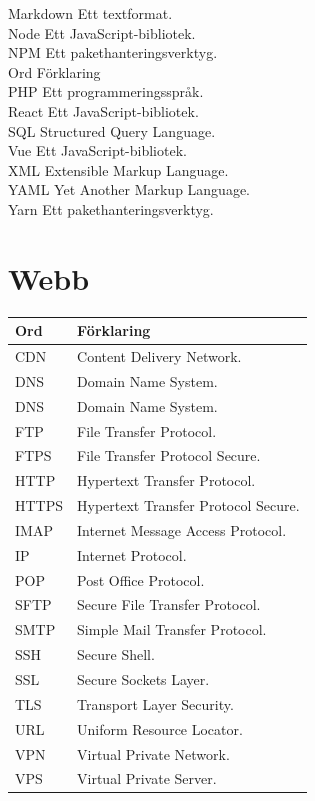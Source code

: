 Markdown \textbar{} Ett textformat. \textbar{}\\
Node \textbar{} Ett JavaScript-bibliotek. \textbar{}\\
NPM \textbar{} Ett pakethanteringsverktyg. \textbar{}\\
Ord \textbar{} Förklaring \textbar{}\\
PHP \textbar{} Ett programmeringsspråk. \textbar{}\\
React \textbar{} Ett JavaScript-bibliotek. \textbar{}\\
SQL \textbar{} Structured Query Language. \textbar{}\\
Vue \textbar{} Ett JavaScript-bibliotek. \textbar{}\\
XML \textbar{} Extensible Markup Language. \textbar{}\\
YAML \textbar{} Yet Another Markup Language. \textbar{}\\
Yarn \textbar{} Ett pakethanteringsverktyg. \textbar{}

\hypertarget{webb}{%
\section{Webb}\label{webb}}

\begin{longtable}[]{@{}ll@{}}
\toprule\noalign{}
Ord & Förklaring \\
\midrule\noalign{}
\endhead
\bottomrule\noalign{}
\endlastfoot
CDN & Content Delivery Network. \\
DNS & Domain Name System. \\
DNS & Domain Name System. \\
FTP & File Transfer Protocol. \\
FTPS & File Transfer Protocol Secure. \\
HTTP & Hypertext Transfer Protocol. \\
HTTPS & Hypertext Transfer Protocol Secure. \\
IMAP & Internet Message Access Protocol. \\
IP & Internet Protocol. \\
POP & Post Office Protocol. \\
SFTP & Secure File Transfer Protocol. \\
SMTP & Simple Mail Transfer Protocol. \\
SSH & Secure Shell. \\
SSL & Secure Sockets Layer. \\
TLS & Transport Layer Security. \\
URL & Uniform Resource Locator. \\
VPN & Virtual Private Network. \\
VPS & Virtual Private Server. \\
\end{longtable}

